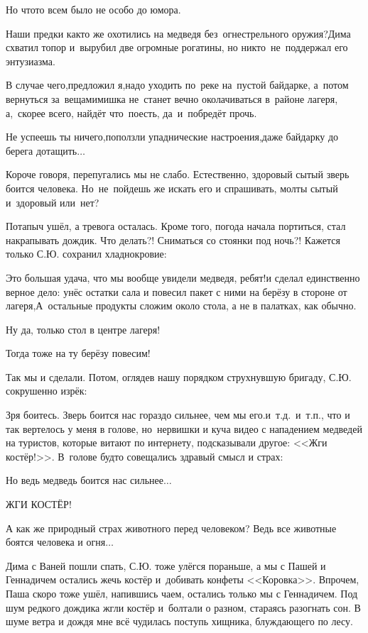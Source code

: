Но что\sdash то всем было не особо до юмора.

\diagdash Наши предки как\sdash то же охотились на медведя без~огнестрельного оружия?\mdash Дима схватил топор и~вырубил две огромные рогатины, но никто~не~поддержал его энтузиазма. 

\diagdash В случае чего,\mdash предложил я,\mdash надо уходить по~реке на~пустой байдарке, а~потом вернуться за~вещами\mdash мишка не~станет вечно околачиваться в~районе лагеря, а,~скорее всего, найдёт что~поесть, да~и~побредёт прочь. 

\diagdash Не успеешь ты ничего,\mdash поползли упаднические настроения,\mdash даже байдарку до берега дотащить$\ldots$

Короче говоря, перепугались мы не слабо. Естественно, здоровый сытый зверь боится человека. Но~не~пойдешь же искать его и спрашивать, мол\mdash ты сытый и~здоровый или~нет? 

Потапыч ушёл, а тревога осталась. Кроме того, погода начала портиться, стал накрапывать дождик. Что делать?! Сниматься со стоянки под ночь?! Кажется только С.Ю. сохранил хладнокровие:

\diagdash Это большая удача, что мы вообще увидели медведя, ребят!\mdash и сделал единственно верное дело: унёс остатки сала и повесил пакет с ними на берёзу в стороне от лагеря,\mdash А~остальные продукты сложим около стола, а не в палатках, как обычно. 

\diagdash Ну да, только стол в центре лагеря!

\diagdash Тогда тоже на ту берёзу повесим!

Так мы и сделали. Потом, оглядев нашу порядком струхнувшую бригаду, С.Ю. сокрушенно изрёк:

\diagdash Зря боитесь. Зверь боится нас гораздо сильнее, чем мы его.\mdash и~т.д.~и~т.п., что и так вертелось у меня в голове, но~нервишки и куча видео с нападением медведей на туристов, которые витают по интернету, подсказывали другое: <<Жги костёр!>>. В~голове будто совещались здравый смысл и страх:

\diagdash Но ведь медведь боится нас сильнее$\ldots$  

\diagdash ЖГИ КОСТЁР! 

\diagdash А как же природный страх животного перед человеком? Ведь все животные боятся человека и огня$\ldots$  


Дима с Ваней пошли спать, С.Ю. тоже улёгся пораньше, а мы с Пашей и Геннадичем остались жечь костёр и~добивать конфеты <<Коровка>>. Впрочем, Паша скоро тоже ушёл, напившись чаем, остались только мы с Геннадичем. Под шум редкого дождика жгли костёр и~болтали о разном, стараясь разогнать сон. В шуме ветра и дождя мне всё чудилась поступь хищника, блуждающего по лесу. 

